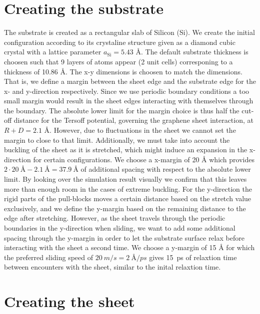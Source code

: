 \section{Creating the substrate}\label{sec:substrate}
The substrate is created as a rectangular slab of Silicon (Si). We create the
initial configuration according to its crystaline structure given as a diamond
cubic crystal with a lattice parameter $a_{\text{Si}} = 5.43$ Å. The default
substrate thickness is choosen such that 9 layers of atoms appear (2 unit cells)
corresponing to a thickness of 10.86 Å. The x-y dimensions is choosen to match the dimensions. That is, we define a margin between the
sheet edge and the substrate edge for the x- and y-direction respectively. Since
we use periodic boundary conditions a too small margin would result in the sheet
edges interacting with themselves through the boundary. The absolute lower limit
for the margin choice is thus half the cut-off distance for the Tersoff potential,
governing the graphene sheet interaction, at $R + D = 2.1$ Å. However, due to
fluctuations in the sheet we cannot set the margin to close to that limit.
Additionally, we must take into account the buckling of the sheet as it is
stretched, which might induce an expansion in the x-direction for certain
configurations. We choose a x-margin of 20 Å which provides $2\cdot
\SI{20}{\text{Å}} - \SI{2.1}{\text{Å}} = \SI{37.9}{\text{Å}}$ of additional
spacing with respect to the absolute lower limit. By looking over the simulation
result visually we confirm that this leaves more than enough room in the cases
of extreme buckling. For the y-direction the rigid parts of the pull-blocks
moves a certain distance based on the stretch value exclusively, and we define
the y-margin based on the remaining distance to the edge after stretching.
However, as the sheet travels through the periodic boundaries in the y-direction
when sliding, we want to add some additional spacing through the y-margin in
order to let the substrate surface relax before interacting with the sheet a
second time. We choose a y-margin of 15 Å for which the preferred sliding speed of
$\SI{20}{m/s} = \SI{2}{\text{Å}/ps}$ gives \SI{15}{ps} of relaxtion time between encounters with the sheet, similar to the inital relaxtion time. 


\section{Creating the sheet}

